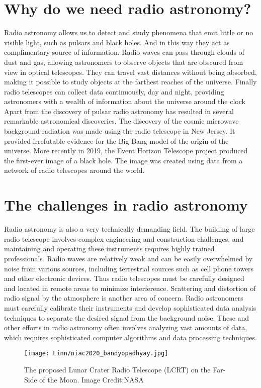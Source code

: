 \documentclass{../template/texnote}
\begin{document}
\section{Why do we need radio astronomy?}
 Radio astronomy allows us to detect and study phenomena that emit little or no visible light, such as pulsars and black holes. And in this way they act as complimentary source of information. Radio waves can pass through clouds of dust and gas, allowing astronomers to observe objects that are obscured from view in optical telescopes. They can travel vast distances without being absorbed, making it possible to study objects at the farthest reaches of the universe. Finally radio telescopes can collect data continuously, day and night, providing astronomers with a wealth of information about the universe around the clock
Apart from the discovery of pulsar radio astronomy has resulted in several remarkable astronomical discoveries. The discovery of the cosmic microwave background radiation was made using the radio telescope in New Jersey. It provided irrefutable evidence for the Big Bang model of the origin of the universe. More recently in 2019, the Event Horizon Telescope project produced the first-ever image of a black hole. The image was created using data from a network of radio telescopes around the world.


\section{The challenges in radio astronomy}
Radio astronomy is also a very technically demanding field. The building of large radio telescope involves complex engineering and construction challenges, and maintaining and operating these instruments requires highly trained professionals. Radio waves are relatively weak and can be easily overwhelmed by noise from various sources, including terrestrial sources such as cell phone towers and other electronic devices. Thus radio telescopes must be carefully designed and located in remote areas to minimize interference. Scattering and distortion of radio signal by the atmosphere is another area of concern. Radio astronomers must carefully calibrate their instruments and develop sophisticated data analysis techniques to separate the desired signal from the background noise. These and other efforts in radio astronomy often involves analyzing vast amounts of data, which requires sophisticated computer algorithms and data processing techniques.

\begin{figure}
    \centering
    \texttt{[image: Linn/niac2020\_bandyopadhyay.jpg]}
    \caption{The proposed Lunar Crater Radio Telescope (LCRT) on the Far-Side of the Moon. Image Credit:NASA}
    \label{fig:radio_moon}
\end{figure}
\end{document}
